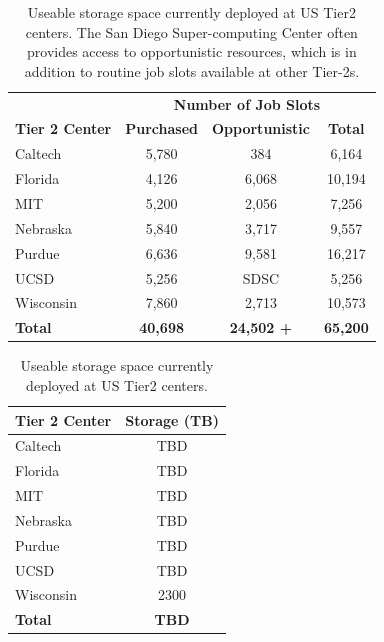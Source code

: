 \documentclass[11pt,a4paper]{article}
\begin{document}
\begin{table}
\begin{center}
\begin{tabular}{|l|c|c|c|}
\hline
& \multicolumn{3}{|c|}{\bf Number of Job Slots} \\ \cline{2-4}
{\bf Tier 2 Center}                         & {\bf Purchased} & {\bf Opportunistic} & {\bf Total} \\ \hline
Caltech                                         & 5,780 &    384 &   6,164 \\
Florida                                          & 4,126 & 6,068 & 10,194 \\
MIT                                               & 5,200 & 2,056 &   7,256 \\
Nebraska                                      & 5,840 & 3,717 &   9,557 \\
Purdue                                          & 6,636 & 9,581 & 16,217 \\
UCSD                                           & 5,256 & SDSC &  5,256 \\ 
Wisconsin                                     & 7,860 & 2,713  & 10,573 \\ \hline
{\bf Total}                                       & {\bf 40,698} & {\bf 24,502 +} & {\bf 65,200} \\ \hline
\end{tabular}
\caption[]
{
Useable storage space currently deployed at US Tier2 centers.
The San Diego Super-computing Center often provides access
to opportunistic resources, which is in addition to routine 
job slots available at other Tier-2s.
}
\label{compute-resources}
\end{center}
\end{table}

\begin{table}
\begin{center}
\begin{tabular}{|l|c|}
\hline
{\bf Tier 2 Center}                         & {\bf Storage (TB)} \\ \hline
Caltech                                         & TBD \\
Florida                                          & TBD \\
MIT                                               & TBD \\
Nebraska                                      & TBD \\
Purdue                                          & TBD \\
UCSD                                           & TBD \\ 
Wisconsin                                     & 2300 \\ \hline
{\bf Total}                                       & {\bf TBD} \\ \hline
\end{tabular}
\caption[]
{
Useable storage space currently deployed at US Tier2 centers.
}
\label{storage-resources}
\end{center}
\end{table}
\end{document}
